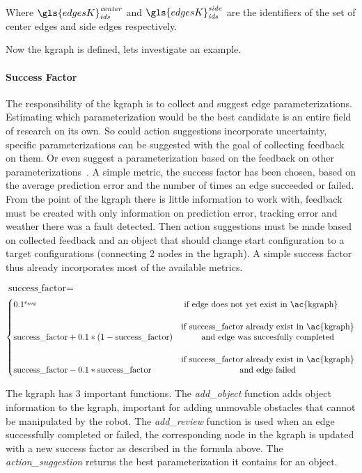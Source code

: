 Where $\gls{edgesK}^\mathit{center}_\mathit{ids}$ and $\gls{edgesK}^\mathit{side}_\mathit{ids}$ are the identifiers of the set of center edges and side edges respectively.\bs 

Now the \ac{kgraph} is defined, lets investigate an example.\bs

\paragraph{Success Factor} The responsibility of the \ac{kgraph} is to collect and suggest edge parameterizations. Estimating which parameterization would be the best candidate is an entire field of research on its own. So could action suggestions incorporate uncertainty, specific  parameterizations can be suggested with the goal of collecting feedback on them. Or even suggest a parameterization based on the feedback on other parameterizations~\cite{kopicki_learning_2017}. A simple metric, the success factor has been chosen, based on the average prediction error and the number of times an edge succeeded or failed. From the point of the \ac{kgraph} there is little information to work with, feedback must be created with only information on prediction error, tracking error and weather there was a fault detected. Then action suggestions must be made based on collected feedback and an object that should change start configuration to a target configurations (connecting 2 nodes in the \ac{hgraph}). A simple success factor thus already incorporates most of the available metrics.\bs


$\textrm{success\_factor} = $
\[
  \begin{cases} 0.1^{\epsilon_{\textrm {avg}}}& \textrm { if edge does not yet exist in \ac{kgraph}}\\ 
    &\\
  \textrm{success\_factor} + 0.1*(1-\textrm{success\_factor}) & \textrm{\shortstack{if success\_factor already exist in \ac{kgraph}\\ and edge was succesfully completed}}\\
    &\\
  \textrm{success\_factor} - 0.1*\textrm{success\_factor} & \textrm{\shortstack{if success\_factor already exist in \ac{kgraph}\\ and edge failed}}
\end{cases}
\]

The \ac{kgraph} has 3 important functions. The \textit{add\_object} function adds object information to the \ac{kgraph}, important for adding unmovable obstacles that cannot be manipulated by the robot. The \textit{add\_review} function is used when an edge successfully completed or failed, the corresponding node in the \ac{kgraph} is updated with a new success factor as described in the formula above. The \textit{action\_suggestion} returns the best parameterization it contains for an object.\bs
